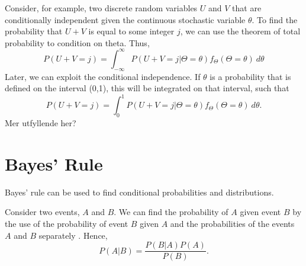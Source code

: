 Consider, for example, two discrete random variables $U$ and $V$ that are conditionally independent given the continuous stochastic variable $\theta$. To find the probability that $U+V$ is equal to some integer $j$, we can use the theorem of total probability to condition on theta. Thus,
\begin{equation*}
    P(U+V=j) = \int_{-\infty}^\infty P(U+V=j|\Theta=\theta)f_{\Theta}(\Theta=\theta) \: d\theta
\end{equation*}
Later, we can exploit the conditional independence. If $\theta$ is a probability that is defined on the interval (0,1), this will be integrated on that interval, such that 
\begin{equation*}
    P(U+V=j) = \int_{0}^1 P(U+V=j|\Theta=\theta)f_{\Theta}(\Theta=\theta) \: d\theta.
\end{equation*}
Mer utfyllende her?




\section{Bayes' Rule}
Bayes' rule can be used to find conditional probabilities and distributions. 
\begin{theorem}
Consider two events, $A$ and $B$. We can find the probability of $A$ given event $B$ by the use of the probability of event $B$ given $A$ and the probabilities of the events $A$ and $B$ separately \citep{statinf}. Hence,
\begin{equation}
\label{bayesrule}
    P(A|B)=\frac{P(B|A)P(A)}{P(B)}.
\end{equation}
\end{theorem}




\begin{comment}
From \citet{schay2016introduction}, we have a version of Bayes' theorem for continuous variables which is stated as 
\begin{theorem}[Bayes' Theorem]
\label{bayestheorem}
For a continuous random variable Y and any event A with nonzero probability, if $P(A|Y=y)$ and $f_Y$ exist for all $y$, then
\begin{equation}
    \label{bayestheorem_eq}
    f_{Y|A}(y) = \frac{P(A|Y=y)f_Y(y)}{\int_{-\infty}^{\infty}P(A|Y=y) f_Y(y) dy}.
\end{equation}
Here $f_Y$is called the prior density of $Y$, and $f_{Y|A}$ its posterior density, referring to the fact that these are the densities of $Y$ before and after the observation of $A$. 
\end{theorem}

From \eqref{lawoftotprob} we see that the denominator is the probability of event $A$, \begin{equation*}
    \int_{-\infty}^{\infty}P(A|Y=y) f_Y(y) = P(A),
\end{equation*}
such that Bayes' theorem can be stated as
\begin{equation}
    \label{bayestheorem_eq2}
    f_{Y|A}(y) = \frac{P(A|Y=y)f_Y(y)}{P(A)}.
\end{equation}


Or:
\end{comment}

